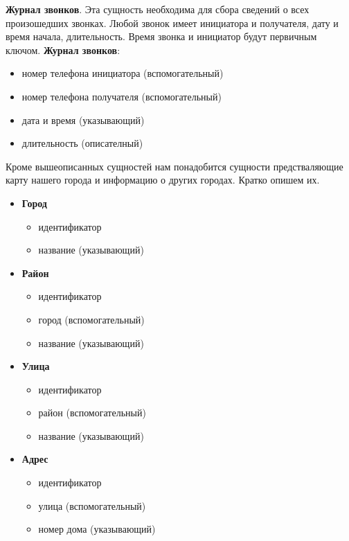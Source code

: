 \documentclass{report}
\begin{document}
\textbf{Журнал звонков}. Эта сущность необходима для сбора сведений 
о всех произошедших звонках. Любой звонок имеет инициатора и получателя, 
дату и время начала, длительность. Время звонка и инициатор 
будут первичным ключом.
\newline\textbf{Журнал звонков}:
\begin{itemize}
    \item номер телефона инициатора (вспомогательный)
    \item номер телефона получателя (вспомогательный)
    \item дата и время (указывающий)
    \item длительность (описателный)
\end{itemize}

Кроме вышеописанных сущностей нам понадобится сущности предстваляющие карту 
нашего города и информацию о других городах. Кратко опишем их.
\begin{itemize}
    \item[] \textbf{Город}
    \begin{itemize}
        \item идентификатор
        \item название (указывающий)
    \end{itemize}
    \item[] \textbf{Район}
    \begin{itemize}
        \item идентификатор
        \item город (вспомогательный)
        \item название (указывающий)
    \end{itemize} 
    \item[] \textbf{Улица}
    \begin{itemize}
        \item идентификатор
        \item район (вспомогательный)
        \item название (указывающий)
    \end{itemize} 
    \item[] \textbf{Адрес}
    \begin{itemize}
        \item идентификатор
        \item улица (вспомогательный)
        \item номер дома (указывающий)
    \end{itemize} 
\end{itemize}
\end{document}
